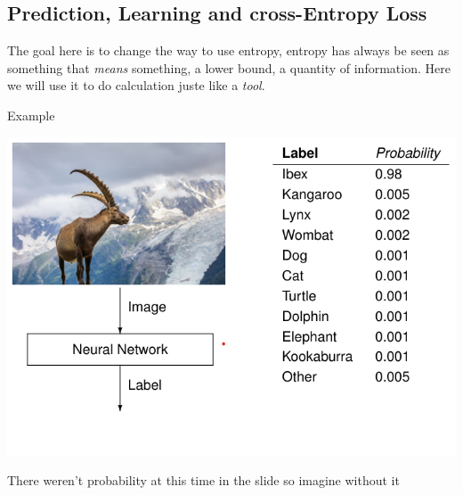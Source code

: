 \subsection{Prediction, Learning and cross-Entropy Loss}
The goal here is to change the way to use entropy, entropy has always be seen as something that \textit{means} something, a lower bound, a quantity of information. Here we will use it to do calculation juste like a \textit{tool}.
\begin{parag}{Example}
\begin{center}
    \includegraphics[scale=0.6]{12025-03-12.png}
\end{center}
\begin{framedremark}
    There weren't probability at this time in the slide so imagine without it
\end{framedremark}


\end{parag}
